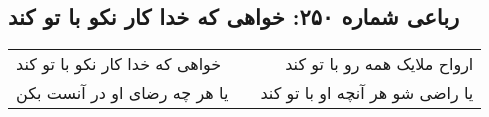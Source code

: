 \begin{center}
\section*{رباعی شماره ۲۵۰: خواهی که خدا کار نکو با تو کند}
\label{sec:sh250}
\begin{longtable}{l p{0.5cm} r}
خواهی که خدا کار نکو با تو کند
&&
ارواح ملایک همه رو با تو کند
\\
یا هر چه رضای او در آنست بکن
&&
یا راضی شو هر آنچه او با تو کند
\\
\end{longtable}
\end{center}
